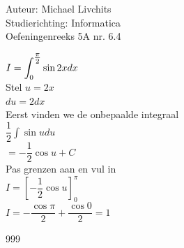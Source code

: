 \documentclass[a4paper]{article}
\newcommand{\dint}{\displaystyle\int}
\begin{document}
  
\noindent \large Auteur: Michael Livchits \\
\noindent \large Studierichting: Informatica\\
\noindent \large Oefeningenreeks 5A nr. 6.4\\

\medskip

\normalsize

$I = \displaystyle\dint_{0}^{\tfrac{\pi}{2}} \sin 2xdx$\\

Stel $u = 2x$\\

$du = 2dx$\\

Eerst vinden we de onbepaalde integraal\\

$\dfrac{1}{2}\displaystyle\int \sin udu$\\

$= -\dfrac{1}{2}\cos u + C$\\

Pas grenzen aan en vul in\\

$I = \left[-\dfrac{1}{2}\cos u\right]_{0}^\pi$\\

$I = -\dfrac{\cos \pi}{2}+\dfrac{\cos 0}{2} = 1$\\

\begin{thebibliography}{999}
\end{thebibliography}
\end{document}
